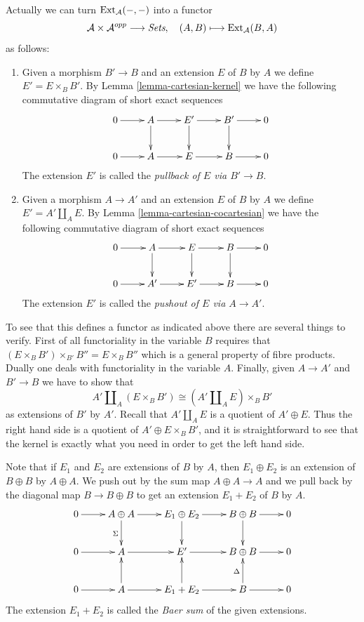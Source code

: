 \medskip\noindent
Actually we can turn $\mathop{\mathrm{Ext}}\nolimits_\mathcal{A}(-, -)$ into a
functor
$$
\mathcal{A} \times \mathcal{A}^{opp} \longrightarrow \textit{Sets}, \quad
(A, B) \longmapsto \mathop{\mathrm{Ext}}\nolimits_\mathcal{A}(B, A)
$$
as follows:
\begin{enumerate}
\item Given a morphism $B' \to B$ and an extension
$E$ of $B$ by $A$ we define $E' = E \times_B B'$.
By Lemma \ref{lemma-cartesian-kernel} we have the following
commutative diagram of short exact sequences
$$
\xymatrix{
0 \ar[r] & A \ar[r] \ar[d] & E' \ar[r] \ar[d] & B' \ar[r] \ar[d] & 0 \\
0 \ar[r] & A \ar[r] & E \ar[r] & B \ar[r] & 0
}
$$
The extension $E'$ is called the {\it pullback of $E$ via
$B' \to B$}.
\item Given a morphism $A \to A'$ and an extension
$E$ of $B$ by $A$ we define $E' = A' \amalg_A E$.
By Lemma \ref{lemma-cartesian-cocartesian}
we have the following commutative diagram
of short exact sequences
$$
\xymatrix{
0 \ar[r] & A \ar[r] \ar[d] & E \ar[r] \ar[d] & B \ar[r] \ar[d] & 0 \\
0 \ar[r] & A' \ar[r] & E' \ar[r] & B \ar[r] & 0
}
$$
The extension $E'$ is called the {\it pushout of $E$ via
$A \to A'$}.
\end{enumerate}
To see that this defines a functor as indicated above
there are several things to verify. First of all
functoriality in the variable $B$ requires that
$(E \times_B B') \times_{B'} B'' = E \times_B B''$
which is a general property of fibre products.
Dually one deals with functoriality in the
variable $A$. Finally, given $A \to A'$ and
$B' \to B$ we have to show that
$$
A' \amalg_A (E \times_B B')
\cong
(A' \amalg_A E)\times_B B'
$$
as extensions of $B'$ by $A'$. Recall that $A' \amalg_A E$
is a quotient of $A' \oplus E$.
Thus the right hand side is a quotient of
$A' \oplus E \times_B B'$, and it is straightforward to see that
the kernel is exactly what you need in order to
get the left hand side.

\medskip\noindent
Note that if $E_1$ and $E_2$ are extensions of
$B$ by $A$, then $E_1\oplus E_2$ is an extension
of $B \oplus B$ by $A\oplus A$. We
push out by the sum map $A \oplus A \to A$ and we
pull back by the diagonal map $B \to B \oplus B$ to get
an extension $E_1 + E_2$ of $B$ by $A$.
$$
\xymatrix{
0 \ar[r] &
A \oplus A \ar[r] \ar[d]_\Sigma &
E_1 \oplus E_2 \ar[r] \ar[d] &
B \oplus B \ar[r] \ar[d] &
0 \\
0 \ar[r] &
A \ar[r] &
E' \ar[r] &
B \oplus B \ar[r] &
0\\
0 \ar[r] &
A \ar[r] \ar[u] &
E_1 + E_2 \ar[r] \ar[u] &
B \ar[r] \ar[u]^\Delta &
0
}
$$
The extension $E_1 + E_2$ is called the {\it Baer sum} of the
given extensions.

